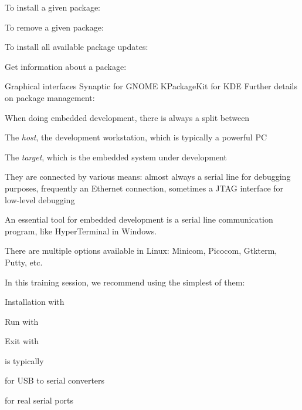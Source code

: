   \startitemize
  \item To install a given package:\\
  \item To remove a given package:\\
  \item To install all available package updates:\\
  \item Get information about a package:\\
  \item Graphical interfaces
    Synaptic for GNOME
    KPackageKit for KDE
  \stopitemize
  Further details on package management:\\

  \startitemize
  \item When doing embedded development, there is always a split between
    \startitemize
    \item The {\em host}, the development workstation, which is
      typically a powerful PC
    \item The {\em target}, which is the embedded system under
      development
    \stopitemize
  \item They are connected by various means: almost always a serial
    line for debugging purposes, frequently an Ethernet connection,
    sometimes a JTAG interface for low-level debugging

  \stopitemize

  \startitemize
  \item An essential tool for embedded development is a serial line
    communication program, like HyperTerminal in Windows.
  \item There are multiple options available in Linux: Minicom,
    Picocom, Gtkterm, Putty, etc.
  \item In this training session, we recommend using the simplest of
    them: 
    \startitemize
    \item Installation with 
    \item Run with 
    \item Exit with 
    \stopitemize
  \item {} is typically
    \startitemize
    \item {} for USB to serial converters
    \item {} for real serial ports
    \stopitemize
  \stopitemize

